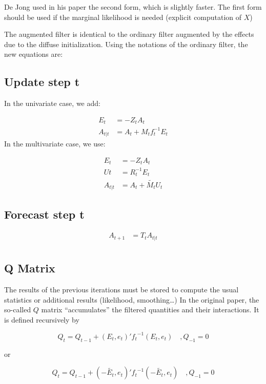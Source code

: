\documentclass[
  letterpaper,
  DIV=11,
  numbers=noendperiod]{scrreprt}
\begin{document}
De Jong used in his paper the second form, which is slightly faster. The
first form should be used if the marginal likelihood is needed (explicit
computation of \(X\))

The augmented filter is identical to the ordinary filter augmented by
the effects due to the diffuse initialization. Using the notations of
the ordinary filter, the new equations are:

\subsection{Update step t}\label{update-step-t-2}

In the univariate case, we add:

\[
\begin{align*}
E_t &= - Z_t A_t \\
A_{t|t} &= A_t + M_t f_t^{-1}E_t 
\end{align*}
\] In the multivariate case, we use:

\[
\begin{align*}
E_t &= - Z_t A_t \\
Ut &= R_t^{-1}E_t \\
A_{t|t} &= A_t + \tilde {M_t} U_t 
\end{align*}
\]

\subsection{Forecast step t}\label{forecast-step-t-2}

\[
\begin{align*}
A_{t+1} &= T_t A_{t|t} \\
\end{align*}
\]

\subsection{Q Matrix}\label{q-matrix}

The results of the previous iterations must be stored to compute the
usual statistics or additional results (likelihood, smoothing\ldots) In
the original paper, the so-called \(Q\) matrix ``accumulates'' the
filtered quantities and their interactions. It is defined recursively by

\[
Q_t = Q_{t-1} + (E_t, e_t)' {f_t}^{-1} (E_t, e_t) \quad , Q_{-1} = 0
\]

or

\[
Q_t = Q_{t-1} + (-\tilde{E_t}, e_t)' {f_t}^{-1} (-\tilde{E_t}, e_t) \quad , Q_{-1} = 0
\]
\end{document}
